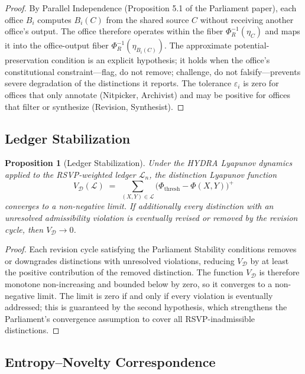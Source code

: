 \documentclass[12pt, a4paper]{article}
\theoremstyle{plain}
\newtheorem{proposition}{Proposition}
\theoremstyle{definition}
\theoremstyle{remark}
\begin{document}
\begin{proof}
By Parallel Independence (Proposition 5.1 of the Parliament paper), each office $B_i$ computes $B_i(C)$ from the shared source $C$ without receiving another office's output. The office therefore operates within the fiber $\Phi_R^{-1}(\eta_C)$ and maps it into the office-output fiber $\Phi_R^{-1}(\eta_{B_i(C)})$. The approximate potential-preservation condition is an explicit hypothesis; it holds when the office's constitutional constraint---flag, do not remove; challenge, do not falsify---prevents severe degradation of the distinctions it reports. The tolerance $\varepsilon_i$ is zero for offices that only annotate (Nitpicker, Archivist) and may be positive for offices that filter or synthesize (Revision, Synthesist).
\end{proof}

\subsection{Ledger Stabilization}

\begin{proposition}[Ledger Stabilization]
\label{thm:stabilization}
Under the HYDRA Lyapunov dynamics applied to the RSVP-weighted ledger $\mathcal{L}_n$, the distinction Lyapunov function
\[
V_\mathcal{D}(\mathcal{L}) \;=\; \sum_{(X,Y) \in \mathcal{L}} \bigl(\Phi_\mathrm{thresh} - \Phi(X,Y)\bigr)^+
\]
converges to a non-negative limit. If additionally every distinction with an unresolved admissibility violation is eventually revised or removed by the revision cycle, then $V_\mathcal{D} \to 0$.
\end{proposition}

\begin{proof}
Each revision cycle satisfying the Parliament Stability conditions removes or downgrades distinctions with unresolved violations, reducing $V_\mathcal{D}$ by at least the positive contribution of the removed distinction. The function $V_\mathcal{D}$ is therefore monotone non-increasing and bounded below by zero, so it converges to a non-negative limit. The limit is zero if and only if every violation is eventually addressed; this is guaranteed by the second hypothesis, which strengthens the Parliament's convergence assumption to cover all RSVP-inadmissible distinctions.
\end{proof}

\subsection{Entropy--Novelty Correspondence}
\end{document}
